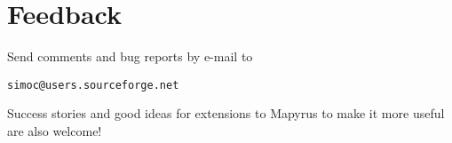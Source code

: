 
\section{Feedback}

Send comments and bug reports by e-mail to
\begin{alltt}
simoc@users.sourceforge.net
\end{alltt}

Success stories
and good ideas for extensions to Mapyrus to make it more useful
are also welcome!
